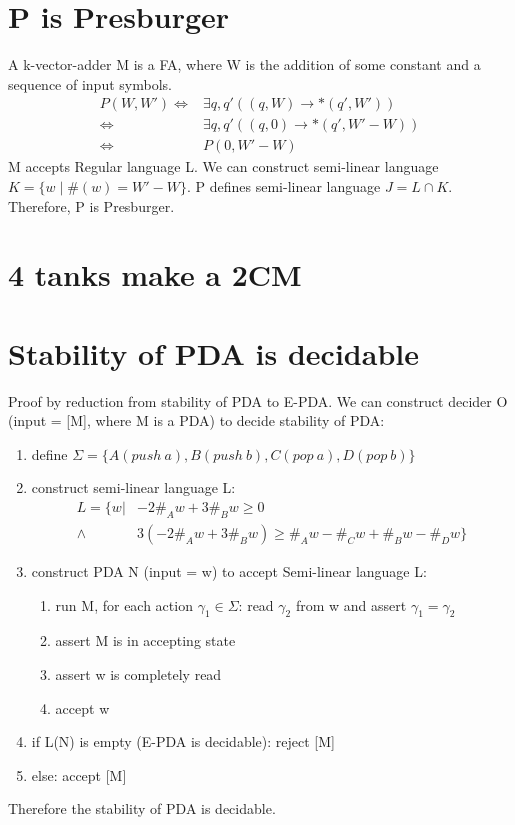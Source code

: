 \documentclass{article}
\begin{document}
\section{P is Presburger}
A k-vector-adder M is a FA, where W is the addition of some constant and a 
sequence of input symbols.
\begin{align*}
	P(W, W')
	\iff& \exists q, q' ((q, W) \rightarrow* (q', W'))\\
	\iff& \exists q, q' ((q, 0) \rightarrow* (q', W'-W))\\
	\iff& P(0, W' - W)
\end{align*}
M accepts Regular language L. We can construct semi-linear language $ K = \{w 
\mid \#(w) = W'-W\} $. P defines semi-linear language $ J = L \cap K $. 
Therefore, P is Presburger.

\section{4 tanks make a 2CM}

\section{Stability of PDA is decidable}
Proof by reduction from stability of PDA to E-PDA. We can construct decider O 
(input = [M], where M is a PDA) to decide stability of PDA:
\begin{enumerate}
	\item define $ \Sigma = \{A(push \ a), B(push \ b), C(pop \ a), D(pop \ 
	b)\} $
	\item construct semi-linear language L:
	\begin{align*}
		L = \{w | & -2\#_Aw + 3\#_Bw \ge 0 \\
		\land & 3(-2\#_Aw + 3\#_Bw) \ge \#_Aw-\#_Cw + \#_Bw-\#_Dw\}
	\end{align*}
	\item construct PDA N (input = w) to accept Semi-linear language L:
	\begin{enumerate}
		\item run M, for each action $ \gamma_1 \in \Sigma $: read $ \gamma_2 $ 
		from w and assert $ \gamma_1 = \gamma_2 $
		\item assert M is in accepting state
		\item assert w is completely read
		\item accept w
	\end{enumerate}
	\item if L(N) is empty (E-PDA is decidable): reject [M]
	\item else: accept [M]
\end{enumerate}
Therefore the stability of PDA is decidable.
\end{document}
